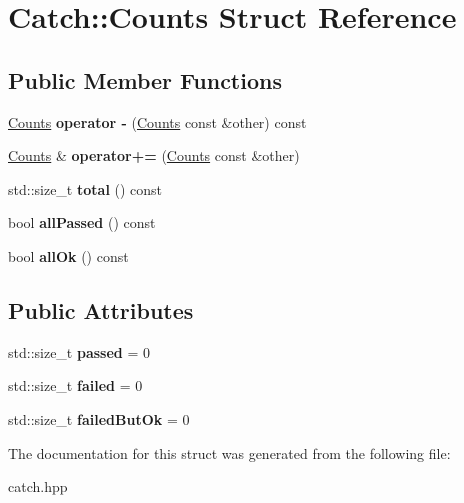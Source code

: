 \hypertarget{structCatch_1_1Counts}{}\section{Catch\+::Counts Struct Reference}
\label{structCatch_1_1Counts}
\subsection*{Public Member Functions}
\begin{DoxyCompactItemize}
\item 
\mbox{\label{structCatch_1_1Counts_a954a6bf7a975467774c5f2795bbda0ac}} 
\mbox{\hyperlink{structCatch_1_1Counts}{Counts}} {\bfseries operator -\/} (\mbox{\hyperlink{structCatch_1_1Counts}{Counts}} const \&other) const
\item 
\mbox{\label{structCatch_1_1Counts_a322a89475cd2cc039140ef371e973677}} 
\mbox{\hyperlink{structCatch_1_1Counts}{Counts}} \& {\bfseries operator+=} (\mbox{\hyperlink{structCatch_1_1Counts}{Counts}} const \&other)
\item 
\mbox{\label{structCatch_1_1Counts_a94f969c09cf52d1339c085c9603cd1d3}} 
std\+::size\+\_\+t {\bfseries total} () const
\item 
\mbox{\label{structCatch_1_1Counts_a84999490e0ecaa3de5e121bf48eda1b3}} 
bool {\bfseries all\+Passed} () const
\item 
\mbox{\label{structCatch_1_1Counts_a33bd996e016030155b99fe1c51c08991}} 
bool {\bfseries all\+Ok} () const
\end{DoxyCompactItemize}
\subsection*{Public Attributes}
\begin{DoxyCompactItemize}
\item 
\mbox{\label{structCatch_1_1Counts_ad28daaf3de28006400208b6dd0c631e6}} 
std\+::size\+\_\+t {\bfseries passed} = 0
\item 
\mbox{\label{structCatch_1_1Counts_a19982a3817a3bc2c07f0290e71f497a3}} 
std\+::size\+\_\+t {\bfseries failed} = 0
\item 
\mbox{\label{structCatch_1_1Counts_ac090973a2ff51394cd452718e75c073e}} 
std\+::size\+\_\+t {\bfseries failed\+But\+Ok} = 0
\end{DoxyCompactItemize}


The documentation for this struct was generated from the following file\+:\begin{DoxyCompactItemize}
\item 
catch.\+hpp\end{DoxyCompactItemize}
